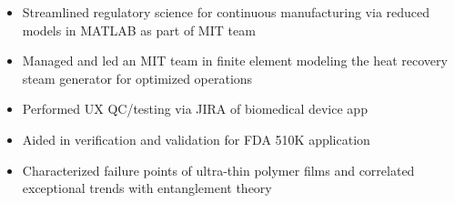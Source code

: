 \documentclass[10.9pt,letterpaper]{altacv}
\newlength{\comlogowidth}
\newcommand{\companylogo}[1]{%
	\savebox{\comlogobox}{\texttt{[image: \#1]}}%
	\settowidth{\comlogowidth}{\usebox{\comlogobox}}
}
\newcommand{\makelogospace}{\hspace*{\comlogowidth}\enspace}
\newcommand{\usecompanylogo}{\raisebox{0pt}[1em]{\usebox{\comlogobox}}\enspace}
\begin{document}
	\begin{itemize}
		\item Streamlined regulatory science for continuous manufacturing via reduced
		models in MATLAB as part of MIT team
	\end{itemize}
	\divider
	
	\begin{itemize}
	\item Managed and led an MIT team in finite element modeling the heat recovery steam generator for optimized operations
	\end{itemize}
	\divider
	
	\begin{itemize}
	\item Performed UX QC/testing via JIRA of biomedical device app
	\item Aided in verification and validation for FDA 510K application
	\end{itemize}
	\divider
	
	\begin{itemize}
	\item Characterized failure points of ultra-thin polymer films and correlated exceptional trends with entanglement theory
	\end{itemize}
 
	
	
	
	
\end{document}
